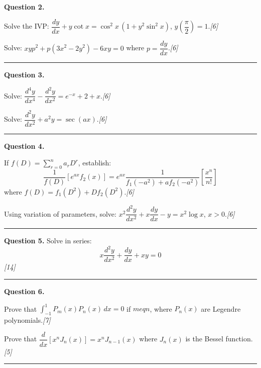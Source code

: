 \documentclass[11pt,a4paper]{article}
\newcommand{\pts}[1]{\hfill   \textit{[#1]}}
\begin{document}
\medskip


\noindent   \textbf{Question 2.}

\begin{parts}
  \item Solve the IVP: $\dfrac{dy}{dx}+y\cot x=\cos^2 x\,(1+y^2\sin^2 x)$, $y\!\left(\dfrac{\pi}{2}\right)=1$.\pts{6}
  \item Solve: $xyp^2+p(3x^2-2y^2)-6xy=0$ where $p=\dfrac{dy}{dx}$.\pts{6}
\end{parts}
\medskip\rule{\linewidth}{0.2pt}

\medskip


\noindent   \textbf{Question 3.}

\begin{parts}
  \item Solve: $\dfrac{d^4y}{dx^4}-\dfrac{d^2y}{dx^2}=e^{-x}+2+x$.\pts{6}
  \item Solve: $\dfrac{d^2y}{dx^2}+a^2y=\sec(ax)$.\pts{6}
\end{parts}
\medskip\rule{\linewidth}{0.2pt}

\medskip


\noindent   \textbf{Question 4.}

\begin{parts}
  \item If $f(D)=\sum_{r=0}^{n}a_r D^r$, establish:
  \[
    \frac{1}{f(D)}[e^{ax}f_2(x)]=e^{ax}\frac{1}{f_1(-a^2)+af_2(-a^2)}\left[\frac{x^n}{n!}\right]
  \]
  where $f(D)=f_1(D^2)+Df_2(D^2)$.\pts{6}
  \item Using variation of parameters, solve: $x^2\dfrac{d^2y}{dx^2}+x\dfrac{dy}{dx}-y=x^2\log x$, $x>0$.\pts{6}
\end{parts}
\medskip\rule{\linewidth}{0.2pt}

\medskip


\noindent   \textbf{Question 5.} Solve in series:
\[
  x\frac{d^2y}{dx^2}+\frac{dy}{dx}+xy=0
\]
\pts{14}
\medskip\rule{\linewidth}{0.2pt}

\medskip


\noindent   \textbf{Question 6.}

\begin{parts}
  \item Prove that $\displaystyle\int_{-1}^{1}P_m(x)P_n(x)\,dx=0$ if $m
eq n$, where $P_n(x)$ are Legendre polynomials.\pts{7}
  \item Prove that $\dfrac{d}{dx}\!\left[x^n J_n(x)\right]=x^n J_{n-1}(x)$ where $J_n(x)$ is the Bessel function.\pts{5}
\end{parts}
\medskip\rule{\linewidth}{0.2pt}
\end{document}
